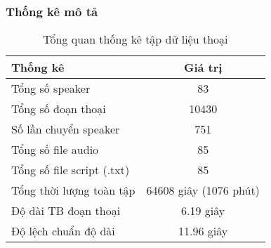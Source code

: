 \documentclass[conference]{IEEEtran}
\begin{document}
\subsubsection{Thống kê mô tả}
\begin{table}
    \centering
    \begin{tabular}{|l|c|}
        \hline
        \textbf{Thống kê}          & \textbf{Giá trị}       \\
        \hline
        Tổng số speaker            & 83                     \\
        Tổng số đoạn thoại         & 10430                  \\
        Số lần chuyển speaker      & 751                    \\
        Tổng số file audio         & 85                     \\
        Tổng số file script (.txt) & 85                     \\
        Tổng thời lượng toàn tập   & 64608 giây (1076 phút) \\
        Độ dài TB đoạn thoại       & 6.19 giây              \\
        Độ lệch chuẩn độ dài       & 11.96 giây             \\
        \hline
    \end{tabular}
    \caption{Tổng quan thống kê tập dữ liệu thoại}
\end{table}





\end{document}
